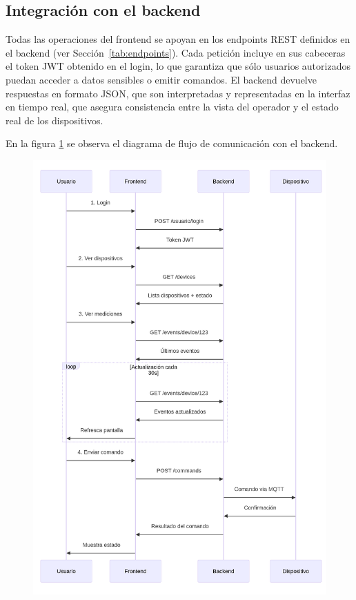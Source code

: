 \subsection{Integración con el backend}

Todas las operaciones del frontend se apoyan en los endpoints REST definidos en el backend (ver Sección~\ref{tab:endpoints}).  
Cada petición incluye en sus cabeceras el token JWT obtenido en el login, lo que garantiza que sólo usuarios autorizados puedan acceder a datos sensibles o emitir comandos.  
El backend devuelve respuestas en formato JSON, que son interpretadas y representadas en la interfaz en tiempo real, que asegura consistencia entre la vista del operador y el estado real de los dispositivos.

En la figura \ref{fig:diagramaflujorestapi} se observa el diagrama de flujo de comunicación con el backend.

\begin{figure}[H]
 
  \centering
  \includegraphics[width=1\linewidth]{./Figures/diagFlujoRestApi.png}
  \label{fig:diagramaflujorestapi}
\end{figure}


